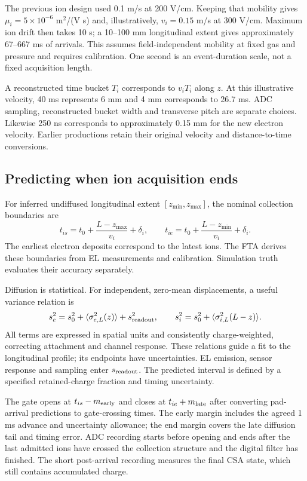 \documentclass[11pt,a4paper]{article}
\begin{document}
The previous ion design used 0.1 m/s at 200 V/cm. Keeping that mobility gives
$\mu_i=5\times10^{-6}$ m$^2$/(V s) and, illustratively, $v_i=0.15$ m/s at
300 V/cm. Maximum ion drift then takes 10 s; a 10--100 mm longitudinal extent
gives approximately 67--667 ms of arrivals. This assumes field-independent
mobility at fixed gas and pressure and requires calibration. One second is an
event-duration scale, not a fixed acquisition length.

A reconstructed time bucket $T_i$ corresponds to $v_iT_i$ along $z$. At this
illustrative velocity, 40 ms represents 6 mm and 4 mm corresponds to 26.7 ms.
ADC sampling, reconstructed bucket width and transverse pitch are separate
choices. Likewise 250 ns corresponds to approximately 0.15 mm for the new
electron velocity. Earlier productions retain their original velocity and
distance-to-time conversions.

\subsection{Predicting when ion acquisition ends}
For inferred undiffused longitudinal extent $[z_{\min},z_{\max}]$, the nominal
collection boundaries are
\begin{equation}
 t_{is}=t_0+\frac{L-z_{\max}}{v_i}+\delta_i,
 \qquad
 t_{ie}=t_0+\frac{L-z_{\min}}{v_i}+\delta_i.
 \label{eq:boundaries}
\end{equation}
The earliest electron deposits correspond to the latest ions. The FTA derives
these boundaries from EL measurements and calibration. Simulation truth
evaluates their accuracy separately.

Diffusion is statistical. For independent, zero-mean displacements, a useful
variance relation is
\begin{equation}
 s_e^2=s_0^2+\langle\sigma_{e,L}^2(z)\rangle+s_{\rm readout}^2,
 \qquad
 s_i^2=s_0^2+\langle\sigma_{i,L}^2(L-z)\rangle.
 \label{eq:widths}
\end{equation}
All terms are expressed in spatial units and consistently charge-weighted,
correcting attachment and channel response. These relations guide a fit to
the longitudinal profile; its endpoints have uncertainties. EL emission,
sensor response and sampling enter $s_{\rm readout}$. The predicted interval
is defined by a specified retained-charge fraction and timing uncertainty.

The gate opens at $t_{is}-m_{\rm early}$ and closes at
$t_{ie}+m_{\rm late}$ after converting pad-arrival predictions to gate-crossing
times. The early margin includes the agreed 1 ms advance and uncertainty
allowance; the end margin covers the late diffusion tail and timing error.
ADC recording starts before opening and ends after the last admitted ions
have crossed the collection structure and the digital filter has finished.
The short post-arrival recording measures the final CSA state, which still
contains accumulated charge.
\end{document}
